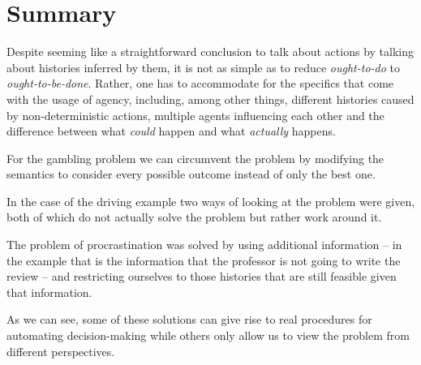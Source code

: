 \documentclass{article}
\begin{document}
\section{Summary}
Despite seeming like a straightforward conclusion to talk about actions by talking about histories inferred by them, it is not as simple as to reduce \emph{ought-to-do} to \emph{ought-to-be-done}. Rather, one has to accommodate for the specifics that come with the usage of agency, including, among other things, different histories caused by non-deterministic actions, multiple agents influencing each other and the difference between what \emph{could} happen and what \emph{actually} happens.

For the gambling problem we can circumvent the problem by modifying the semantics to consider every possible outcome instead of only the best one.

In the case of the driving example two ways of looking at the problem were given, both of which do not actually solve the problem but rather work around it.

The problem of procrastination was solved by using additional information -- in the example that is the information that the professor is not going to write the review -- and restricting ourselves to those histories that are still feasible given that information.

As we can see, some of these solutions can give rise to real procedures for automating decision-making while others only allow us to view the problem from different perspectives.



\nocite{*}

\end{document}
